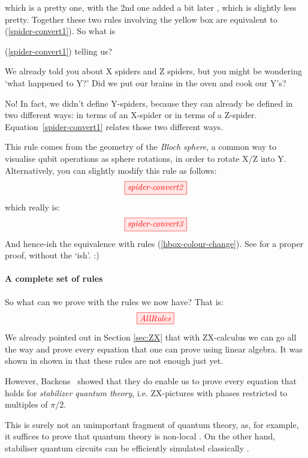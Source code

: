 \documentclass[11pt]{article}
\theoremstyle{definition}
\newcommand{\beq}{\begin{equation}}
\newcommand{\eeq}{\end{equation}\par\noindent}
\begin{document}
which is a pretty one, with the 2nd one added a bit later \cite{duncan2009graph}, which is slightly less pretty.  Together these two rules involving the yellow box are equivalent to (\ref{spider-convert1}).  So what is {(\ref{spider-convert1}) telling us?

We already told you about X spiders and Z spiders, but you might be wondering `what happened to Y?' Did we put our brains in the oven and cook our Y's?

No! In fact, we didn't define Y-spiders, because they can already be defined in two different ways: in terms of an X-spider or in terms of a Z-spider. Equation~\eqref{spider-convert1} relates those two different ways.

This rule comes from the geometry of the \textit{Bloch sphere}, a common way to visualise qubit operations as sphere rotations, in order to rotate X/Z into Y.  Alternatively, you can slightly modify this rule as follows:
\[
\tikzfig{spider-convert2}    
\]
which really is:
\[
\tikzfig{spider-convert3}    
\]
And hence-ish the equivalence with  rules (\ref{hbox-colour-change}). See \cite{CKbook} for a proper proof, without the `ish'. :)

\paragraph{A complete set of rules}  So what can we prove with the rules we now have? That is: 
\begin{equation}\label{stabrules}
\tikzfig{AllRules}
\end{equation}
We already pointed out in Section \ref{sec:ZX} that with ZX-calculus we can go all the way and prove every equation that one can prove using linear algebra. It was shown in shown in \cite{VladComp} that these rules are not enough just yet.

However, Backens~\cite{Backens} showed that they do enable us to prove every equation that holds for \textit{stabilizer quantum theory}, i.e. ZX-pictures with phases restricted to multiples of $\pi/2$.


This is surely not an unimportant fragment of quantum theory, as, for example, it suffices to prove that quantum theory is non-local \cite{CDKZ}.  On the other hand, stabiliser quantum circuits can be efficiently simulated classically \cite{GottesmanKnill}.

}
\end{document}
